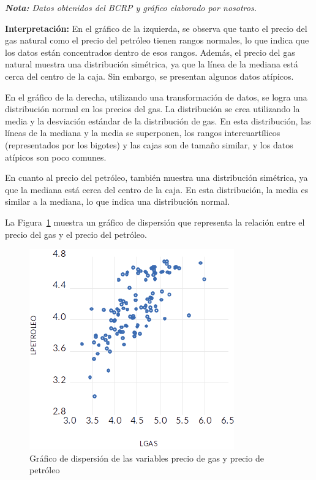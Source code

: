 \documentclass[
  letterpaper,
  DIV=11,
  numbers=noendperiod]{scrartcl}
\begin{document}
\emph{\textbf{Nota:} Datos obtenidos del BCRP y gráfico elaborado por
nosotros.}

\textbf{Interpretación:} En el gráfico de la izquierda, se observa que
tanto el precio del gas natural como el precio del petróleo tienen
rangos normales, lo que indica que los datos están concentrados dentro
de esos rangos. Además, el precio del gas natural muestra una
distribución simétrica, ya que la línea de la mediana está cerca del
centro de la caja. Sin embargo, se presentan algunos datos atípicos.

En el gráfico de la derecha, utilizando una transformación de datos, se
logra una distribución normal en los precios del gas. La distribución se
crea utilizando la media y la desviación estándar de la distribución de
gas. En esta distribución, las líneas de la mediana y la media se
superponen, los rangos intercuartílicos (representados por los bigotes)
y las cajas son de tamaño similar, y los datos atípicos son poco
comunes.

En cuanto al precio del petróleo, también muestra una distribución
simétrica, ya que la mediana está cerca del centro de la caja. En esta
distribución, la media es similar a la mediana, lo que indica una
distribución normal.

La Figura~\ref{fig-11} muestra un gráfico de dispersión que representa
la relación entre el precio del gas y el precio del petróleo.

\begin{figure}

\caption{\label{fig-11}Gráfico de dispersión de las variables precio de
gas y precio de petróleo}

{\centering \includegraphics{20230603091904.png}

}

\end{figure}
\end{document}

